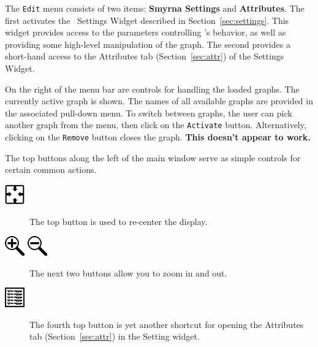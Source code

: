 The {\tt Edit} menu consists of two items: {\bf Smyrna Settings} and {\bf Attributes}.
The first activates the \smyrna\ Settings Widget described in
Section~\ref{sec:settings}. This widget provides access to the parameters controlling
\smyrna's behavior, as well as providing some high-level manipulation of the graph.
The second provides a short-hand access to the Attributes tab (Section~\ref{sec:attr})
of the Settings Widget. 

On the right of the menu bar are controls for handling the loaded graphs.
The currently active graph is shown. The names of all available graphs are provided in the
associated pull-down menu. To switch between graphs, the user can pick another graph from
the menu, then click on the {\tt Activate} button. Alternatively, clicking on the {\tt Remove}
button closes the graph. {\bf This doesn't appear to work.}

The top buttons along the left of the main window serve as simple controls for
certain common actions. 
\begin{description}
\item[\includegraphics{figures/center.png}]
The top button is used to re-center the display. 
\item[\includegraphics{figures/zoomin.png} \includegraphics{figures/zoomout.png}]
The next two buttons allow you to zoom in and
out. 
\item[\includegraphics{figures/details.png}]
The fourth top button is yet another shortcut for opening the 
Attributes tab (Section~\ref{sec:attr}) in the Setting widget.
\end{description}


